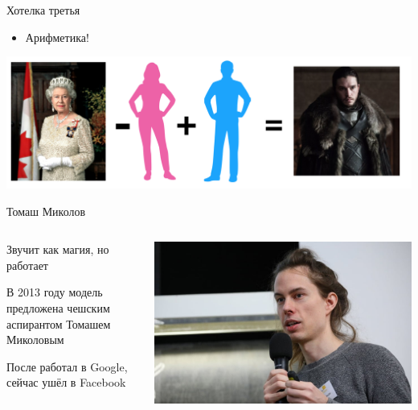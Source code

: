 \documentclass[notes,12pt, aspectratio=169]{beamer}
\newenvironment{wideitemize}{\itemize\addtolength{\itemsep}{10pt}}{\enditemize}
\begin{document}
\begin{frame}{Хотелка третья}
\begin{itemize} 
\item Арифметика! 
\end{itemize} 

\begin{center}
\includegraphics[width=.8\linewidth]{w2v_arith.png}
\end{center}
\end{frame} 



\begin{frame}{Томаш Миколов}
\begin{columns}[T] 
\begin{column}{.4\textwidth}
\begin{wideitemize} 
\item Звучит как магия, но работает

\item  В 2013 году модель предложена чешским аспирантом  Томашем Миколовым

\item После работал в Google, сейчас ушёл в Facebook  
\end{wideitemize} 
\end{column}%
\hfill%
\begin{column}{.6\textwidth}
\begin{center}
\includegraphics[width=.99\linewidth]{tomas-mikolov.jpg}
\end{center}
\end{column}%
\end{columns}
\end{frame}
\end{document}
